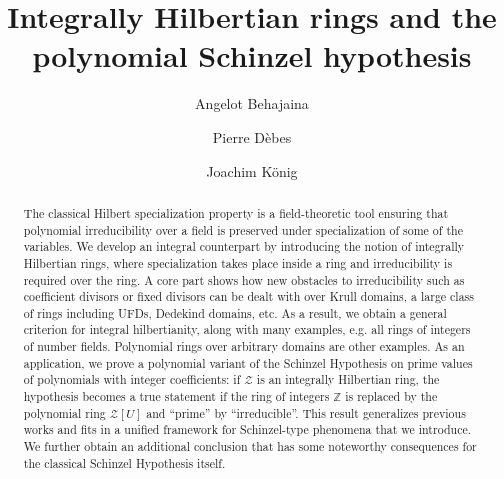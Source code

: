 \documentclass[11pt,a4paper,reqno]{amsart}
\title{Integrally Hilbertian rings and  \break the polynomial Schinzel hypothesis}
\author{Angelot Behajaina}
\author{Pierre D\`{e}bes}
\author{Joachim König}
\theoremstyle{definition}
\begin{document}
\begin{abstract}
The classical Hilbert specialization property is a field-theoretic tool ensuring that polynomial irreducibility over a field is preserved under specialization of some of the variables. We develop an integral counterpart  by introducing the notion of {integrally Hilbertian rings}, where specialization takes place inside a ring and irreducibility is required over the ring. A core part shows how new obstacles to irreducibility such as 
coefficient divisors or fixed divisors can be dealt with over Krull domains, a large class of rings including UFDs, Dedekind domains, etc. 
As a result, we obtain a general criterion for integral hilbertianity, along with 
many examples, \hbox{e.g.} all rings of integers of number fields.
Polynomial rings over arbitrary domains are other examples. As an application, we prove a polynomial variant of the Schinzel Hypothesis
on prime values of polynomials with integer coefficients: if $\mathcal{Z}$ is an integrally Hilbertian ring, the hypothesis becomes a true statement if the ring of integers ${\mathbb Z}$ is replaced by the polynomial ring $\mathcal{Z}[U]$ and ``prime'' by ``irreducible''.
This result generalizes previous works and fits in a unified framework for Schinzel-type phenomena that we introduce. We
further obtain an additional conclusion that has some noteworthy consequences  for the classical Schinzel Hypothesis itself.
\end{abstract}
\end{document}
